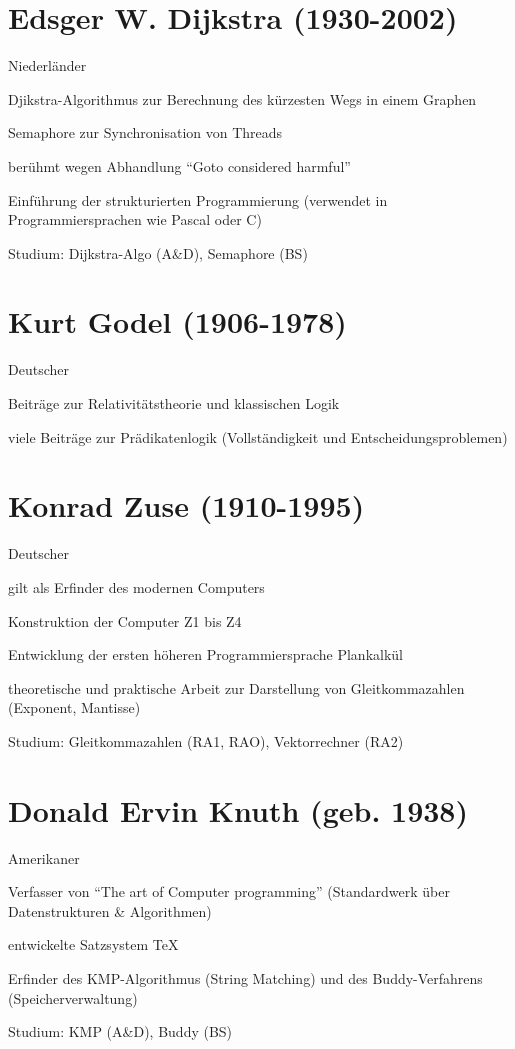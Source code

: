 \documentclass[a4paper,12pt]{report}
\begin{document}
\section{Edsger W. Dijkstra (1930-2002)}
\begin{itemize*}
\item Niederländer
\item Djikstra-Algorithmus zur Berechnung des kürzesten Wegs in einem Graphen
\item Semaphore zur Synchronisation von Threads
\item berühmt wegen Abhandlung ``Goto considered harmful''
\item Einführung der strukturierten Programmierung (verwendet in Programmiersprachen wie Pascal oder C)
\item Studium: Dijkstra-Algo (A\&D), Semaphore (BS)
\end{itemize*}

\section{Kurt Godel (1906-1978)}
\begin{itemize*}
\item Deutscher
\item Beiträge zur Relativitätstheorie und klassischen Logik
\item viele Beiträge zur Prädikatenlogik (Vollständigkeit und Entscheidungsproblemen)
\end{itemize*}

\section{Konrad Zuse (1910-1995)}
\begin{itemize*}
\item Deutscher
\item gilt als Erfinder des modernen Computers
\item Konstruktion der Computer Z1 bis Z4
\item Entwicklung der ersten höheren Programmiersprache Plankalkül
\item theoretische und praktische Arbeit zur Darstellung von Gleitkommazahlen (Exponent, Mantisse)
\item Studium: Gleitkommazahlen (RA1, RAO), Vektorrechner (RA2)
\end{itemize*}

\section{Donald Ervin Knuth (geb. 1938)}
\begin{itemize*}
\item Amerikaner
\item Verfasser von ``The art of Computer programming'' (Standardwerk über Datenstrukturen \& Algorithmen)
\item entwickelte Satzsystem TeX
\item Erfinder des KMP-Algorithmus (String Matching) und des Buddy-Verfahrens (Speicherverwaltung)
\item Studium: KMP (A\&D), Buddy (BS)
\end{itemize*}
\end{document}
